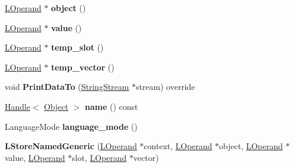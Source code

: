 \begin{DoxyCompactItemize}
\item 
\hyperlink{classv8_1_1internal_1_1_l_operand}{L\+Operand} $\ast$ {\bfseries object} ()\hypertarget{classv8_1_1internal_1_1_l_store_named_generic_aa1b18be662cea0c3778374ff8b43defe}{}\label{classv8_1_1internal_1_1_l_store_named_generic_aa1b18be662cea0c3778374ff8b43defe}

\item 
\hyperlink{classv8_1_1internal_1_1_l_operand}{L\+Operand} $\ast$ {\bfseries value} ()\hypertarget{classv8_1_1internal_1_1_l_store_named_generic_aec8db1a93603a3b4113708cbceebcec8}{}\label{classv8_1_1internal_1_1_l_store_named_generic_aec8db1a93603a3b4113708cbceebcec8}

\item 
\hyperlink{classv8_1_1internal_1_1_l_operand}{L\+Operand} $\ast$ {\bfseries temp\+\_\+slot} ()\hypertarget{classv8_1_1internal_1_1_l_store_named_generic_a18a6a60e809a89d7846e671670701c0d}{}\label{classv8_1_1internal_1_1_l_store_named_generic_a18a6a60e809a89d7846e671670701c0d}

\item 
\hyperlink{classv8_1_1internal_1_1_l_operand}{L\+Operand} $\ast$ {\bfseries temp\+\_\+vector} ()\hypertarget{classv8_1_1internal_1_1_l_store_named_generic_a128a00fb66f92d2aafae55ae0b99b887}{}\label{classv8_1_1internal_1_1_l_store_named_generic_a128a00fb66f92d2aafae55ae0b99b887}

\item 
void {\bfseries Print\+Data\+To} (\hyperlink{classv8_1_1internal_1_1_string_stream}{String\+Stream} $\ast$stream) override\hypertarget{classv8_1_1internal_1_1_l_store_named_generic_a71e5fdb3cd3c873fcaace82fa3a0291b}{}\label{classv8_1_1internal_1_1_l_store_named_generic_a71e5fdb3cd3c873fcaace82fa3a0291b}

\item 
\hyperlink{classv8_1_1internal_1_1_handle}{Handle}$<$ \hyperlink{classv8_1_1internal_1_1_object}{Object} $>$ {\bfseries name} () const \hypertarget{classv8_1_1internal_1_1_l_store_named_generic_a0fcb3f4bcaad0355374c20f5f3d215ab}{}\label{classv8_1_1internal_1_1_l_store_named_generic_a0fcb3f4bcaad0355374c20f5f3d215ab}

\item 
Language\+Mode {\bfseries language\+\_\+mode} ()\hypertarget{classv8_1_1internal_1_1_l_store_named_generic_a9aaa8911322a00bb960fa5f3e132ee3c}{}\label{classv8_1_1internal_1_1_l_store_named_generic_a9aaa8911322a00bb960fa5f3e132ee3c}

\item 
{\bfseries L\+Store\+Named\+Generic} (\hyperlink{classv8_1_1internal_1_1_l_operand}{L\+Operand} $\ast$context, \hyperlink{classv8_1_1internal_1_1_l_operand}{L\+Operand} $\ast$object, \hyperlink{classv8_1_1internal_1_1_l_operand}{L\+Operand} $\ast$value, \hyperlink{classv8_1_1internal_1_1_l_operand}{L\+Operand} $\ast$slot, \hyperlink{classv8_1_1internal_1_1_l_operand}{L\+Operand} $\ast$vector)\hypertarget{classv8_1_1internal_1_1_l_store_named_generic_a5e3f7dd8c808499319eaac553c49aea7}{}\label{classv8_1_1internal_1_1_l_store_named_generic_a5e3f7dd8c808499319eaac553c49aea7}


\end{DoxyCompactItemize}
